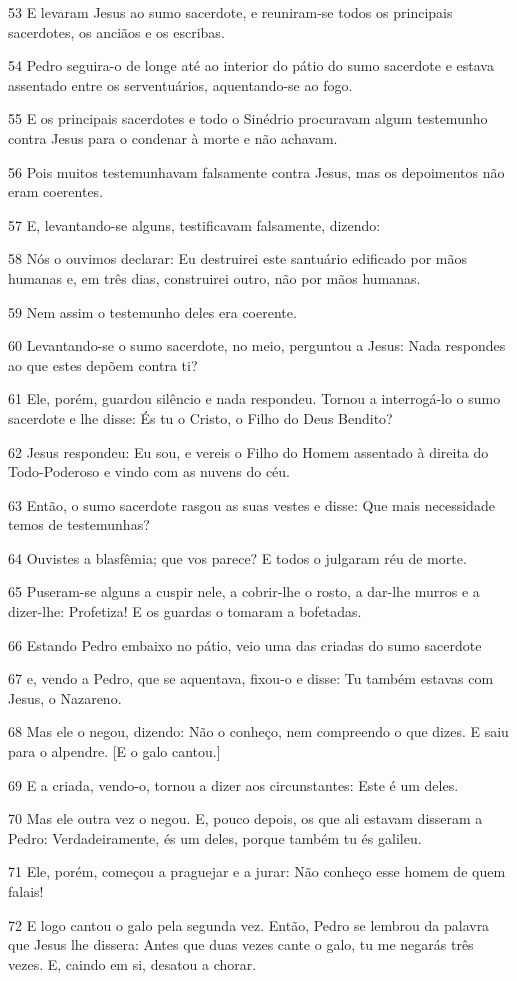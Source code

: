 \par 53 E levaram Jesus ao sumo sacerdote, e reuniram-se todos os principais sacerdotes, os anciãos e os escribas.
\par 54 Pedro seguira-o de longe até ao interior do pátio do sumo sacerdote e estava assentado entre os serventuários, aquentando-se ao fogo.
\par 55 E os principais sacerdotes e todo o Sinédrio procuravam algum testemunho contra Jesus para o condenar à morte e não achavam.
\par 56 Pois muitos testemunhavam falsamente contra Jesus, mas os depoimentos não eram coerentes.
\par 57 E, levantando-se alguns, testificavam falsamente, dizendo:
\par 58 Nós o ouvimos declarar: Eu destruirei este santuário edificado por mãos humanas e, em três dias, construirei outro, não por mãos humanas.
\par 59 Nem assim o testemunho deles era coerente.
\par 60 Levantando-se o sumo sacerdote, no meio, perguntou a Jesus: Nada respondes ao que estes depõem contra ti?
\par 61 Ele, porém, guardou silêncio e nada respondeu. Tornou a interrogá-lo o sumo sacerdote e lhe disse: És tu o Cristo, o Filho do Deus Bendito?
\par 62 Jesus respondeu: Eu sou, e vereis o Filho do Homem assentado à direita do Todo-Poderoso e vindo com as nuvens do céu.
\par 63 Então, o sumo sacerdote rasgou as suas vestes e disse: Que mais necessidade temos de testemunhas?
\par 64 Ouvistes a blasfêmia; que vos parece? E todos o julgaram réu de morte.
\par 65 Puseram-se alguns a cuspir nele, a cobrir-lhe o rosto, a dar-lhe murros e a dizer-lhe: Profetiza! E os guardas o tomaram a bofetadas.
\par 66 Estando Pedro embaixo no pátio, veio uma das criadas do sumo sacerdote
\par 67 e, vendo a Pedro, que se aquentava, fixou-o e disse: Tu também estavas com Jesus, o Nazareno.
\par 68 Mas ele o negou, dizendo: Não o conheço, nem compreendo o que dizes. E saiu para o alpendre. [E o galo cantou.]
\par 69 E a criada, vendo-o, tornou a dizer aos circunstantes: Este é um deles.
\par 70 Mas ele outra vez o negou. E, pouco depois, os que ali estavam disseram a Pedro: Verdadeiramente, és um deles, porque também tu és galileu.
\par 71 Ele, porém, começou a praguejar e a jurar: Não conheço esse homem de quem falais!
\par 72 E logo cantou o galo pela segunda vez. Então, Pedro se lembrou da palavra que Jesus lhe dissera: Antes que duas vezes cante o galo, tu me negarás três vezes. E, caindo em si, desatou a chorar.

